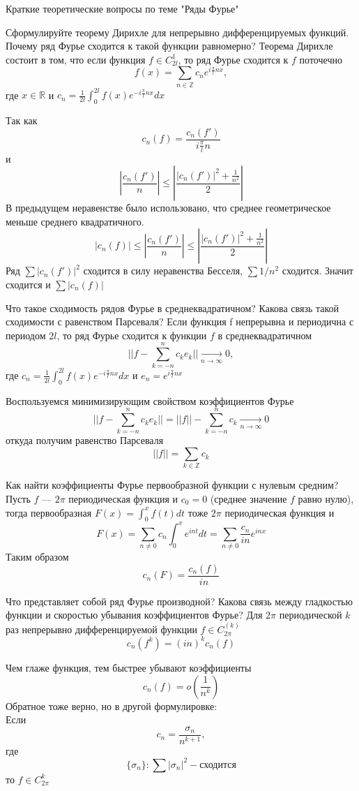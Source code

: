 \documentclass{article}
\begin{document}
\begin{section}{Краткие теоретические вопросы по теме "Ряды Фурье"}
\begin{subsection}{Сформулируйте теорему Дирихле для непрерывно дифференцируемых функций. Почему ряд Фурье сходится к такой функции равномерно?}
Теорема Дирихле состоит в том, что если функция $f \in C_{2l}^1$, то ряд Фурье сходится к $f$ поточечно
\[f(x)=\sum_{n \in \mathbb{Z}} c_n e^{i\frac{\pi}{l}nx}, \]
где $x \in \mathbb{R}$ и $c_n = \frac{1}{2l}\int_0^{2l}f(x)e^{-i\frac{\pi}{l}nx}dx$

Так как
\[ c_n(f) = \frac{c_n(f')}{i\frac{\pi}{l}n} \]
и \[ \left| \frac{c_n(f')}{n} \right| \leq \left|\frac{|c_n(f')|^2 + \frac{1}{n^2}}{2}\right|\]
В предыдущем неравенстве было использовано, что среднее геометрическое меньше среднего квадратичного.
\[ |c_n(f)| \leq \left| \frac{c_n(f')}{n} \right| \leq \left|\frac{|c_n(f')|^2 + \frac{1}{n^2}}{2}\right|\] 
Ряд $\sum |c_n(f')|^2$ сходится в силу неравенства Бесселя, $\sum 1/n^2$ сходится. Значит сходится и $\sum |c_n(f)|$ 
\end{subsection}


\begin{subsection}{Что такое сходимость рядов Фурье в среднеквадратичном? Какова связь такой сходимости с равенством Парсеваля?}
Если функция f непрерывна и периодична с периодом $ 2l $, то ряд Фурье сходится к функции $ f $ в среднеквадратичном
\[ ||f-\sum_{k=-n}^{n} c_k e_k|| \underset{n \rightarrow \infty}{\longrightarrow} 0 ,\] 
где $c_n = \frac{1}{2l}\int_0^{2l}f(x)e^{-i\frac{\pi}{l}nx}dx$ и $e_n = e^{i\frac{\pi}{l}nx}$

Воспользуемся минимизирующим свойством коэффициентов Фурье 
\[ ||f-\sum_{k=-n}^{n} c_k e_k|| = 
||f|| - \sum_{k=-n}^{n}c_k \underset{n \rightarrow \infty}{\longrightarrow} 0\]
откуда получим равенство Парсеваля
\[ ||f|| = \sum_{k \in \mathbb{Z}} c_k \]
\end{subsection}


\begin{subsection}{Как найти коэффициенты Фурье первообразной функции с нулевым средним?}
Пусть $ f $ ---  $ 2\pi $ периодическая функция и $ c_0 = 0 $ (среднее значение $f$ равно нулю), тогда первообразная $ F(x) = \int_{0}^{x}f(t)dt $ тоже $ 2\pi $ периодическая функция и 
\[ F(x) = \sum_{n \neq 0}c_n \int_{0}^{x} e^{int}dt = \sum_{n \neq 0} \frac{c_n}{in} e^{inx}\]
Таким образом 
\[ c_n(F)=\frac{c_n(f)}{in} \]
\end{subsection}


\begin{subsection}{Что представляет собой ряд Фурье производной? Какова связь между гладкостью функции и скоростью убывания коэффициентов Фурье?}
Для $ 2\pi $ периодической $ k $ раз непрерывно дифференцируемой функции $ f \in C_{2\pi}^{(k)} $
\[ c_n(f^{k}) = (in)^k c_n(f)  \]

Чем глаже функция, тем быстрее убывают коэффициенты 
\[ c_n(f) = o\left(\frac{1}{n^k}\right)\]
Обратное тоже верно, но в другой формулировке:\\
Если
\[ c_n = \frac{\sigma_n}{n^{k+1}}, \]
где \[ \{\sigma_n\}: \sum |\sigma_n|^2 - \text{сходится}  \]
то $f \in C_{2\pi}^k$
\end{subsection}

\end{section}
\end{document}
